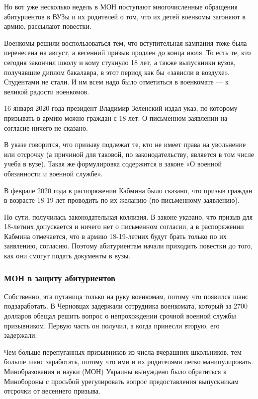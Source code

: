 Но вот уже несколько недель в МОН поступают многочисленные обращения
абитуриентов в ВУЗы и их родителей о том, что их детей военкомы загоняют в
армию, рассылают повестки. 

Военкомы решили воспользоваться тем, что вступительная кампания тоже была
перенесена на август, а весенний призыв продлен до конца июля. То есть те, кто
сегодня закончил школу и кому стукнуло 18 лет, а также выпускники вузов,
получавшие диплом бакалавра, в этот период как бы «зависли в воздухе».
Студентами не стали. И им всем надо было отметиться в военкомате --- к великой
радости военкомов. 

16 января 2020 года президент Владимир Зеленский издал указ, по которому
призывать в армию можно граждан с 18 лет. О письменном заявлении на согласие
ничего не сказано. 

В указе говорится, что призыву подлежат те, кто не имеет права на увольнение
или отсрочку (а причиной для таковой, по законодательству, является в том числе
учеба в вузе). Такая же формулировка содержится в законе «О военной обязанности
и военной службе». 

В феврале 2020 года в распоряжении Кабмина было сказано, что призыв граждан в
возрасте 18-19 лет проводить по их желанию (по письменному заявлению). 

По сути, получилась законодательная коллизия. В законе указано, что призыв для
18-летних допускается и ничего нет о письменном согласии, а в распоряжении
Кабмина отмечается, что в армию 18-19-летних будут брать только по их
заявлению, согласию. Поэтому абитуриентам начали приходить повестки до того,
как они смогут подать документы в вузы. 

\subsubsection{МОН в защиту абитуриентов }

Собственно, эта путаница только на руку военкомам, потому что появился шанс
подзаработать. В Черновцах задержали сотрудника военкомата, который за 2700
долларов обещал решить вопрос о непрохождении срочной военной службы
призывником. Первую часть он получил, а когда принесли вторую, его задержали. 

Чем больше перепуганных призывников из числа вчерашних школьников, тем больше
шанс заработать, потому что ими и их родителями легко манипулировать.
Минобразования и науки (МОН) Украины вынуждено было обратиться к Минобороны с
просьбой урегулировать вопрос предоставления выпускникам отсрочки от весеннего
призыва. 

